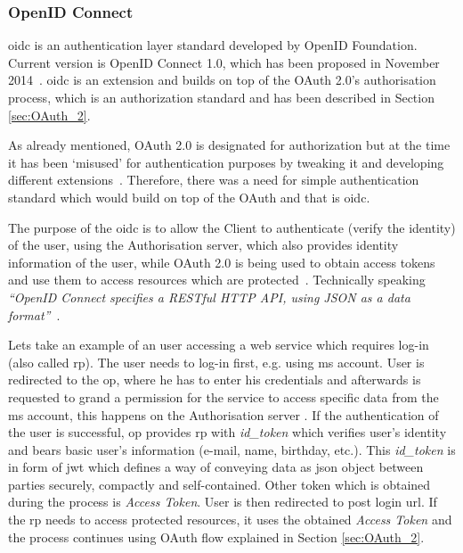 \subsubsection{OpenID Connect}

\acrfull{oidc} is an authentication layer standard developed by OpenID Foundation. Current version is OpenID Connect 1.0, which has been proposed in November 2014~\cite{Sakimura2014Final:1}. \acrshort{oidc} is an extension and builds on top of the OAuth 2.0’s authorisation process, which is an authorization standard and has been described in Section \ref{sec:OAuth_2}. 

As already mentioned, OAuth 2.0 is designated for authorization but at the time it has been ‘misused’ for authentication purposes by tweaking it and developing different extensions~\cite{RicherUser2.0}. Therefore, there was a need for simple authentication standard which would build on top of the OAuth and that is \acrshort{oidc}.

The purpose of the \acrshort{oidc} is to allow the Client to authenticate (verify the identity) of the user, using the Authorisation server, which also provides identity information of the user, while OAuth 2.0 is being used to obtain access tokens and use them to access resources which are protected~\cite{OpenIDSpecs}. Technically speaking \textit{“OpenID Connect specifies a RESTful HTTP API, using JSON as a data format”}~\cite{OpenIDSpecs}.

Lets take an example of an user accessing a web service which requires log-in (also called \acrfull{rp}). The user needs to log-in first, e.g. using \acrfull{ms} account. User is redirected to the \acrfull{op}, where he has to enter his credentials and afterwards is requested to grand a permission for the service to access specific data from the \acrshort{ms} account, this happens on the Authorisation server
. If the authentication of the user is successful, \acrshort{op} provides \acrfull{rp} with \textit{id\_token} which verifies user’s identity and bears basic user’s information (e-mail, name, birthday, etc.). This \textit{id\_token} is in form of \acrfull{jwt} which defines a way of conveying data as \acrshort{json} object between parties securely, compactly and self-contained. Other token which is obtained during the process is \textit{Access Token}. User is then redirected to post login \acrshort{url}. If the  \acrshort{rp} needs to access protected resources, it uses the obtained \textit{Access Token} and the process continues using OAuth flow explained in Section \ref{sec:OAuth_2}.